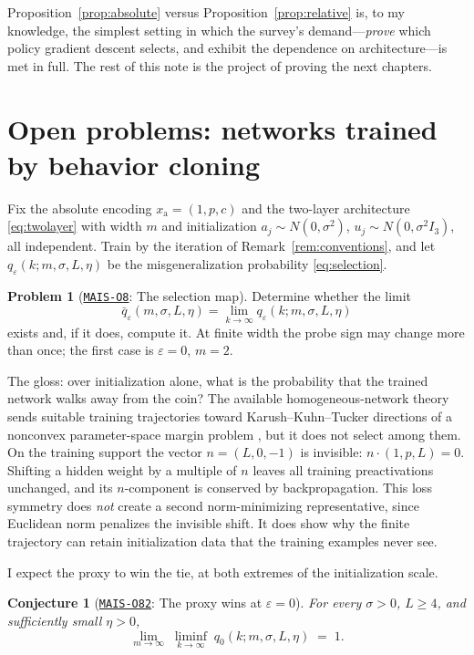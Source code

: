 \documentclass[11pt]{amsart}
\newcommand{\Oid}[1]{\href{https://github.com/lionellevine/MAIS/blob/main/open-problems/MAIS-O#1.md}{\texttt{MAIS-O#1}}}
\theoremstyle{plain}
\newtheorem{conjecture}[theorem]{Conjecture}
\theoremstyle{definition}
\newtheorem{problem}[theorem]{Problem}
\begin{document}
Proposition~\ref{prop:absolute} versus Proposition~\ref{prop:relative} is, to my knowledge, the simplest setting in which the survey's demand---\emph{prove} which policy gradient descent selects, and exhibit the dependence on architecture---is met in full. The rest of this note is the project of proving the next chapters.

\section{Open problems: networks trained by behavior cloning}\label{sec:nets}

Fix the absolute encoding $x_{\mathrm a}=(1,p,c)$ and the two-layer architecture \eqref{eq:twolayer} with width $m$ and initialization $a_j\sim N(0,\sigma^2)$, $u_j\sim N(0,\sigma^2 I_3)$, all independent. Train by the iteration of Remark~\ref{rem:conventions}, and let $q_\varepsilon(k;m,\sigma,L,\eta)$ be the misgeneralization probability \eqref{eq:selection}.

\begin{problem}[\Oid{8}: The selection map]\label{prob:selectionmap}
Determine whether the limit
\[
\bar q_\varepsilon(m,\sigma,L,\eta)
   =\lim_{k\to\infty}q_\varepsilon(k;m,\sigma,L,\eta)
\]
exists and, if it does, compute it. At finite width the probe sign may change more than once; the first case is $\varepsilon=0$, $m=2$.
\end{problem}

The gloss: over initialization alone, what is the probability that the trained network walks away from the coin? The available homogeneous-network theory sends suitable training trajectories toward Karush--Kuhn--Tucker directions of a nonconvex parameter-space margin problem \cite{lyu2020,jitelgarsky2020}, but it does not select among them. On the training support the vector $n=(L,0,-1)$ is invisible: $n\cdot(1,p,L)=0$. Shifting a hidden weight by a multiple of $n$ leaves all training preactivations unchanged, and its $n$-component is conserved by backpropagation. This loss symmetry does \emph{not} create a second norm-minimizing representative, since Euclidean norm penalizes the invisible shift. It does show why the finite trajectory can retain initialization data that the training examples never see.

I expect the proxy to win the tie, at both extremes of the initialization scale.

\begin{conjecture}[\Oid{82}: The proxy wins at $\varepsilon=0$]\label{conj:proxywins}
For every $\sigma>0$, $L\ge4$, and sufficiently small $\eta>0$,
\[
   \lim_{m\to\infty}\;\liminf_{k\to\infty}\;q_0(k;m,\sigma,L,\eta)\;=\;1 .
\]
\end{conjecture}
\end{document}
